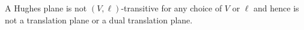 A Hughes plane is not $(V, \ell)$-transitive for any choice of $V$ or $\ell$ and hence is not a translation plane or a dual translation plane.
